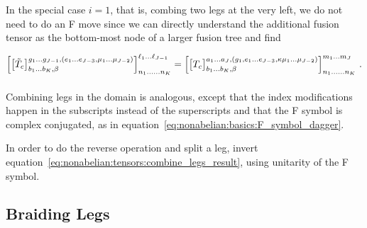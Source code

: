 In the special case $i=1$, that is, combing two legs at the very left, we do not need to do an F move since we can directly understand the additional fusion tensor as the bottom-most node of a larger fusion tree and find
\begin{equation}
    \Big[ \big[ \tilde{T}_c \big]^{g_1\dots g_{J-1},(e_1\dots e_{J-3}, \mu_1\dots \mu_{J-2})}_{b_1\dots b_K,\beta} \Big]^{\ell_1\dots \ell_{J-1}}_{n_1\dots \dots n_K}
    =
    \Big[ \big[ T_c \big]^{a_1\dots a_J,(g_1,e_1\dots e_{J-3}, \kappa\mu_1\dots \mu_{J-2})}_{b_1\dots b_K,\beta} \Big]^{m_1\dots m_J}_{n_1\dots \dots n_K}
    \vphantom{\Bigg]}
    ~.
\end{equation}

Combining legs in the domain is analogous, except that the index modifications happen in the subscripts instead of the superscripts and that the F symbol is complex conjugated, as in equation~\eqref{eq:nonabelian:basics:F_symbol_dagger}.

In order to do the reverse operation and split a leg, invert equation~\eqref{eq:nonabelian:tensors:combine_legs_result}, using unitarity of the F symbol.

\subsection{Braiding Legs}
\label{subsec:nonabelian:tensors:braiding}

